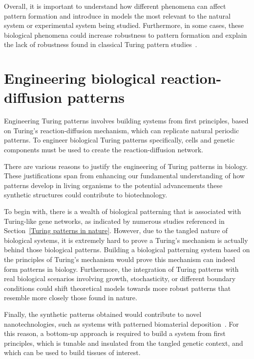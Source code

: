 Overall, it is important to understand how different phenomena can affect pattern formation and introduce in models the most relevant to the natural system or experimental system being studied.
Furthermore, in some cases, these biological phenomena could increase robustness to pattern formation and explain the lack of robustness found in classical Turing pattern studies~\parencite{Scholes2019}.


\section{Engineering biological reaction-diffusion patterns}
Engineering Turing patterns involves building systems from first principles, based on Turing's reaction-diffusion mechanism, which can replicate natural periodic patterns.
To engineer biological Turing patterns specifically, cells and genetic components must be used to create the reaction-diffusion network.


There are various reasons to justify the engineering of Turing patterns in biology.
These justifications span from enhancing our fundamental understanding of how patterns develop in living organisms to the potential advancements these synthetic structures could contribute to biotechnology.

To begin with, there is a wealth of biological patterning that is associated with Turing-like gene networks, as indicated by numerous studies referenced in Section~\ref{Turing patterns in nature}.
However, due to the tangled nature of biological systems, it is extremely hard to prove a Turing’s mechanism is actually behind those biological patterns.
Building a biological patterning system based on the principles of Turing's mechanism would prove this mechanism can indeed form patterns in biology.
Furthermore, the integration of Turing patterns with real biological scenarios involving growth, stochasticity, or different boundary conditions could shift theoretical models towards more robust patterns that resemble more closely those found in nature.

Finally, the synthetic patterns obtained would contribute to novel nanotechnologies, such as systems with patterned biomaterial deposition~\parencite{Din2020, Cao2017}.
For this reason, a bottom-up approach is required to build a system from first principles, which is tunable and insulated from the tangled genetic context, and which can be used to build tissues of interest.



